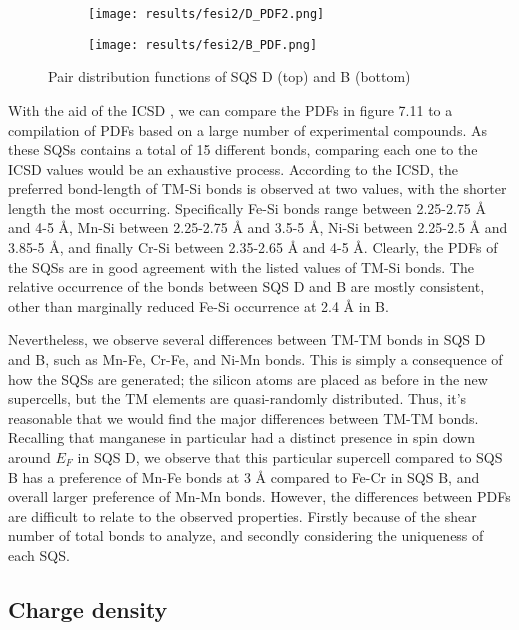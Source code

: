 \begin{figure}[H]
	\centering
	\begin{subfigure}{\textwidth}
		\texttt{[image: results/fesi2/D\_PDF2.png]}
	\end{subfigure}
	\begin{subfigure}{\textwidth}
		\texttt{[image: results/fesi2/B\_PDF.png]}
	\end{subfigure}
	\caption{Pair distribution functions of SQS D (top) and B (bottom)}
\end{figure}

With the aid of the ICSD \cite{icsd}, we can compare the PDFs in figure 7.11 to a compilation of PDFs based on a large number of experimental compounds. As these SQSs contains a total of 15 different bonds, comparing each one to the ICSD values would be an exhaustive process. According to the ICSD, the preferred bond-length of TM-Si bonds is observed at two values, with the shorter length the most occurring. Specifically Fe-Si bonds range between 2.25-2.75 Å and 4-5 Å, Mn-Si between 2.25-2.75 Å and 3.5-5 Å, Ni-Si between 2.25-2.5 Å and 3.85-5 Å, and finally Cr-Si between 2.35-2.65 Å and 4-5 Å. Clearly, the PDFs of the SQSs are in good agreement with the listed values of TM-Si bonds. The relative occurrence of the bonds between SQS D and B are mostly consistent, other than marginally reduced Fe-Si occurrence at 2.4 Å in B.

Nevertheless, we observe several differences between TM-TM bonds in SQS D and B, such as  Mn-Fe, Cr-Fe, and Ni-Mn bonds. This is simply a consequence of how the SQSs are generated; the silicon atoms are placed as before in the new supercells, but the TM elements are quasi-randomly distributed. Thus, it's reasonable that we would find the major differences between TM-TM bonds. Recalling that manganese in particular had a distinct presence in spin down around $E_F$ in SQS D, we observe that this particular supercell compared to SQS B has a preference of Mn-Fe bonds at 3 Å compared to Fe-Cr in SQS B, and overall larger preference of Mn-Mn bonds. However, the differences between PDFs are difficult to relate to the observed properties. Firstly because of the shear number of total bonds to analyze, and secondly considering the uniqueness of each SQS.

\subsection{Charge density}

